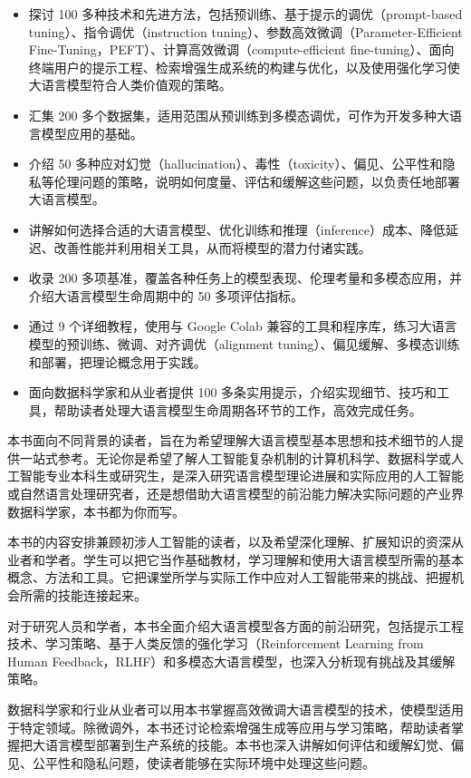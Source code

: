 \begin{itemize}
\item 探讨 100 多种技术和先进方法，包括预训练、基于提示的调优（prompt-based tuning）、指令调优（instruction tuning）、参数高效微调（Parameter-Efficient Fine-Tuning，PEFT）、计算高效微调（compute-efficient fine-tuning）、面向终端用户的提示工程、检索增强生成系统的构建与优化，以及使用强化学习使大语言模型符合人类价值观的策略。
\item 汇集 200 多个数据集，适用范围从预训练到多模态调优，可作为开发多种大语言模型应用的基础。
\item 介绍 50 多种应对幻觉（hallucination）、毒性（toxicity）、偏见、公平性和隐私等伦理问题的策略，说明如何度量、评估和缓解这些问题，以负责任地部署大语言模型。
\item 讲解如何选择合适的大语言模型、优化训练和推理（inference）成本、降低延迟、改善性能并利用相关工具，从而将模型的潜力付诸实践。
\item 收录 200 多项基准，覆盖各种任务上的模型表现、伦理考量和多模态应用，并介绍大语言模型生命周期中的 50 多项评估指标。
\item 通过 9 个详细教程，使用与 Google Colab 兼容的工具和程序库，练习大语言模型的预训练、微调、对齐调优（alignment tuning）、偏见缓解、多模态训练和部署，把理论概念用于实践。
\item 面向数据科学家和从业者提供 100 多条实用提示，介绍实现细节、技巧和工具，帮助读者处理大语言模型生命周期各环节的工作，高效完成任务。
\end{itemize}

本书面向不同背景的读者，旨在为希望理解大语言模型基本思想和技术细节的人提供一站式参考。无论你是希望了解人工智能复杂机制的计算机科学、数据科学或人工智能专业本科生或研究生，是深入研究语言模型理论进展和实际应用的人工智能或自然语言处理研究者，还是想借助大语言模型的前沿能力解决实际问题的产业界数据科学家，本书都为你而写。

本书的内容安排兼顾初涉人工智能的读者，以及希望深化理解、扩展知识的资深从业者和学者。学生可以把它当作基础教材，学习理解和使用大语言模型所需的基本概念、方法和工具。它把课堂所学与实际工作中应对人工智能带来的挑战、把握机会所需的技能连接起来。

对于研究人员和学者，本书全面介绍大语言模型各方面的前沿研究，包括提示工程技术、学习策略、基于人类反馈的强化学习（Reinforcement Learning from Human Feedback，RLHF）和多模态大语言模型，也深入分析现有挑战及其缓解策略。

数据科学家和行业从业者可以用本书掌握高效微调大语言模型的技术，使模型适用于特定领域。除微调外，本书还讨论检索增强生成等应用与学习策略，帮助读者掌握把大语言模型部署到生产系统的技能。本书也深入讲解如何评估和缓解幻觉、偏见、公平性和隐私问题，使读者能够在实际环境中处理这些问题。

